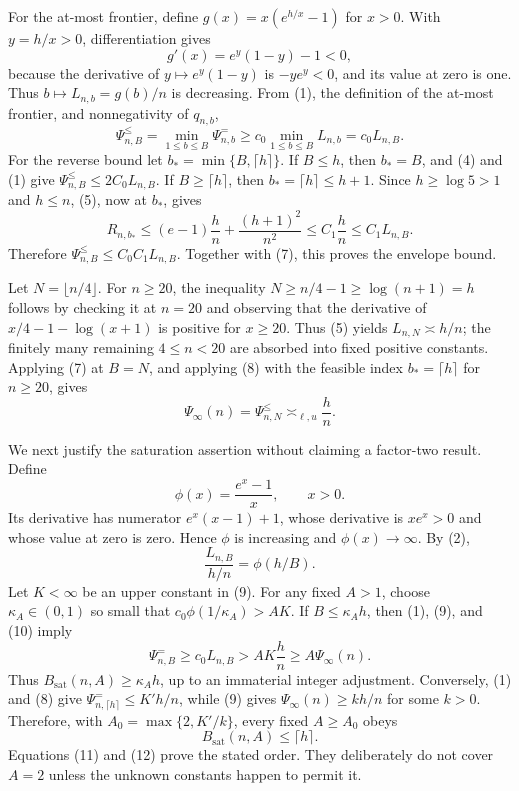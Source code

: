 For the at-most frontier, define \(g(x)=x(e^{h/x}-1)\) for \(x>0\). With \(y=h/x>0\), differentiation gives
\[
g'(x)=e^y(1-y)-1<0,                               \tag{6}
\]
because the derivative of \(y\mapsto e^y(1-y)\) is \(-ye^y<0\), and its value at zero is one. Thus \(b\mapsto L_{n,b}=g(b)/n\) is decreasing. From (1), the definition of the at-most frontier, and nonnegativity of \(q_{n,b}\),
\[
\Psi^{\leq}_{n,B}
=\min_{1\leq b\leq B}\Psi^{=}_{n,b}
\geq c_0\min_{1\leq b\leq B}L_{n,b}
=c_0L_{n,B}.                                      \tag{7}
\]
For the reverse bound let \(b_* =\min\{B,\lceil h\rceil\}\). If \(B\leq h\), then \(b_*=B\), and (4) and (1) give
\(\Psi^{\leq}_{n,B}\leq 2C_0L_{n,B}\). If \(B\geq\lceil h\rceil\), then \(b_*=\lceil h\rceil\leq h+1\). Since \(h\geq\log5>1\) and \(h\leq n\), (5), now at \(b_*\), gives
\[
R_{n,b_*}
\leq(e-1)\frac{h}{n}+\frac{(h+1)^2}{n^2}
\leq C_1\frac{h}{n}
\leq C_1L_{n,B}.                                  \tag{8}
\]
Therefore \(\Psi^{\leq}_{n,B}\leq C_0C_1L_{n,B}\). Together with (7), this proves the envelope bound.

Let \(N=\lfloor n/4\rfloor\). For \(n\geq20\), the inequality \(N\geq n/4-1\geq\log(n+1)=h\) follows by checking it at \(n=20\) and observing that the derivative of \(x/4-1-\log(x+1)\) is positive for \(x\geq20\). Thus (5) yields \(L_{n,N}\asymp h/n\); the finitely many remaining \(4\leq n<20\) are absorbed into fixed positive constants. Applying (7) at \(B=N\), and applying (8) with the feasible index \(b_*=\lceil h\rceil\) for \(n\geq20\), gives
\[
\Psi_\infty(n)=\Psi^{\leq}_{n,N}\asymp_{\ell,u}\frac{h}{n}. \tag{9}
\]

We next justify the saturation assertion without claiming a factor-two result. Define
\[
\phi(x)=\frac{e^x-1}{x},\qquad x>0.
\]
Its derivative has numerator \(e^x(x-1)+1\), whose derivative is \(xe^x>0\) and whose value at zero is zero. Hence \(\phi\) is increasing and \(\phi(x)\to\infty\). By (2),
\[
\frac{L_{n,B}}{h/n}=\phi(h/B).                    \tag{10}
\]
Let \(K<\infty\) be an upper constant in (9). For any fixed \(A>1\), choose \(\kappa_A\in(0,1)\) so small that
\(c_0\phi(1/\kappa_A)>AK\). If \(B\leq\kappa_Ah\), then (1), (9), and (10) imply
\[
\Psi^{=}_{n,B}\geq c_0L_{n,B}>AK\frac{h}{n}\geq A\Psi_\infty(n). \tag{11}
\]
Thus \(B_{\mathrm{sat}}(n,A)\geq\kappa_Ah\), up to an immaterial integer adjustment. Conversely, (1) and (8) give
\(\Psi^{=}_{n,\lceil h\rceil}\leq K'h/n\), while (9) gives
\(\Psi_\infty(n)\geq kh/n\) for some \(k>0\). Therefore, with
\(A_0=\max\{2,K'/k\}\), every fixed \(A\geq A_0\) obeys
\[
B_{\mathrm{sat}}(n,A)\leq\lceil h\rceil.          \tag{12}
\]
Equations (11) and (12) prove the stated order. They deliberately do not cover \(A=2\) unless the unknown constants happen to permit it.

